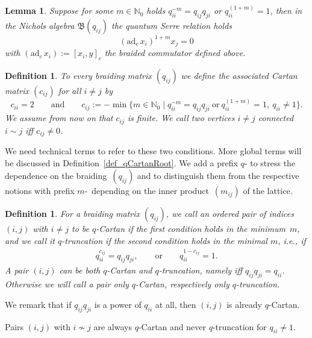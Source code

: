 \documentclass[pdftex]{sigma}%
\numberwithin{equation}{section}
\newtheorem{lem}[teo]{Lemma}
\newtheorem{defin}[teo]{Definition}
\newcommand{\N}{\mathbb{N}}
\begin{document}
\begin{lem}\label{lm_Serre} Suppose for some $m\in\N_0$ holds $q_{ii}^{-m} = q_{ij}q_{ji}$ or $q_{ii}^{(1+m)} = 1$, then in the Nichols algebra $\mathfrak{B}(q_{ij})$ the \emph{quantum Serre relation} holds
	\[(\mathrm{ad}_c\,x_i)^{1+m} x_j=0\]
	with $(\mathrm{ad}_c\,x_i):=[x_i,y]_c$ the braided commutator defined above.
\end{lem}
\begin{defin}
To every braiding matrix $(q_{ij})$ we define the associated Cartan matrix $(c_{ij})$ for all $i\neq j$ by
\begin{equation*}%
c_{ii}=2 \qquad \text{and} \qquad c_{ij}:=-\min  \big\lbrace m \in \N_0 \mid q_{ii}^{-m} = q_{ij}q_{ji} \  \text{or} \  q_{ii}^{(1+m)} = 1,
\ q_{ii}\neq 1\big\rbrace.
\end{equation*} 	
We assume from now on that $c_{ij}$ is finite. We call two vertices $i\neq j$ \emph{connected} $i\sim j$ iff $c_{ij}\neq 0$.
\end{defin}
We need technical terms to refer to these two conditions. More global terms will be discussed in Definition~\ref{def_qCartanRoot}. We add a prefix $q$- to stress the dependence on the braiding~$(q_{ij})$ and to distinguish them from the respective notions with prefix $m$-~depending on the inner product~$(m_{ij})$ of the lattice.
\begin{defin}
	For a braiding matrix $(q_{ij})$, we call an ordered pair of indices $(i,j)$ with $i\neq j$ to be \emph{$q$-Cartan} if the first condition holds in the minimum~$m$, and we call it \emph{$q$-truncation} if the second condition holds in the minimal $m$, i.e., if
	\begin{align*}%
	q_{ii}^{c_{ij}}=q_{ij}q_{ji},  \qquad \text{or}  \qquad q_{ii}^{1-c_{ij}}=1.
	\end{align*}
	A pair $(i,j)$ can be \emph{both} $q$-Cartan and $q$-truncation, namely iff
	$q_{ij}q_{ji}=q_{ii}$.
 	Otherwise we will call a pair \emph{only} $q$-Cartan, respectively \emph{only} $q$-truncation.
\end{defin}

We remark that if $q_{ij}q_{ji}$ is a power of $q_{ii}$ at all, then $(i,j)$ is already $q$-Cartan.

Pairs $(i,j)$ with $i\not\sim j$ are always $q$-Cartan and never $q$-truncation for $q_{ii}\neq 1$.
\end{document}
